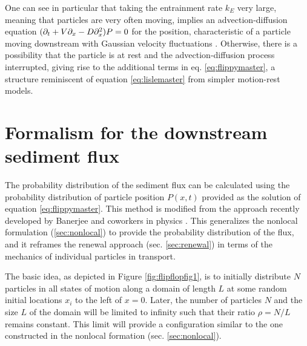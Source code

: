 One can see in particular that taking the entrainment rate $k_E$ very large, meaning that particles are very often moving, implies an advection-diffusion equation $(\partial_t + V\partial_x -D \partial_x^2)P=0$ for the position, characteristic of a particle moving downstream with Gaussian velocity fluctuations \citep{Ancey2014}. Otherwise, there is a possibility that the particle is at rest and the advection-diffusion process interrupted, giving rise to the additional terms in eq. \ref{eq:flippymaster}, a structure reminiscent of equation \ref{eq:lislemaster} from simpler motion-rest models.

\section{Formalism for the downstream sediment flux}
\label{sec:flippyflux}

The probability distribution of the sediment flux can be calculated using the probability distribution of particle position $P(x,t)$ provided as the solution of equation \ref{eq:flippymaster}.
This method is modified from the approach recently developed by Banerjee and coworkers in physics \citep{Banerjee2020}.
This generalizes the nonlocal formulation (\ref{sec:nonlocal}) to provide the probability distribution of the flux, and it reframes the renewal approach (sec. \ref{sec:renewal}) in terms of the mechanics of individual particles in transport.

The basic idea, as depicted in Figure \ref{fig:flipflopfig1}, is to initially distribute $N$ particles in all states of motion along a domain of length $L$ at some random initial locations $x_i$ to the left of $x=0$.
Later, the number of particles $N$ and the size $L$ of the domain will be limited to infinity such that their ratio $\rho=N/L$ remains constant. 
This limit will provide a configuration similar to the one constructed in the nonlocal formation (sec. \ref{sec:nonlocal}).


